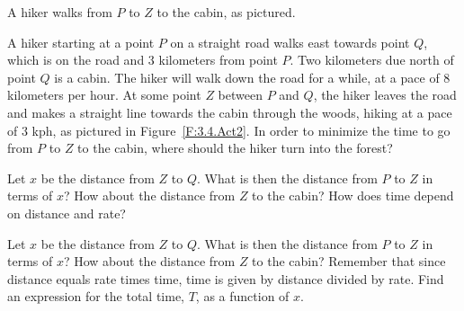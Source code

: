 \begin{marginfigure}[6cm]
\caption{A hiker walks from $P$ to $Z$ to the cabin, as pictured.} \label{F:3.4.Act2}
\end{marginfigure}

\begin{activity} \label{A:3.4.2}  A hiker starting at a point $P$ on a straight road walks east towards point $Q$, which is on the road and $3$ kilometers from point $P$.  Two kilometers due north of point $Q$ is a cabin.  The hiker will walk down the road for a while, at a pace of $8$ kilometers per hour.  At some point $Z$ between $P$ and $Q$, the hiker leaves the road and makes a straight line towards the cabin through the woods, hiking at a pace of $3$ kph, as pictured in Figure~\ref{F:3.4.Act2}.  In order to minimize the time to go from $P$ to $Z$ to the cabin, where should the hiker turn into the forest?

\end{activity}
\begin{smallhint}
Let $x$ be the distance from $Z$ to $Q$. What is then the distance from $P$ to $Z$ in terms of $x$?  How about the distance from $Z$ to the cabin?  How does time depend on distance and rate?
\end{smallhint}
\begin{bighint}
Let $x$ be the distance from $Z$ to $Q$. What is then the distance from $P$ to $Z$ in terms of $x$?  How about the distance from $Z$ to the cabin?  Remember that since distance equals rate times time, time is given by distance divided by rate.  Find an expression for the total time, $T$, as a function of $x$.
\end{bighint}
